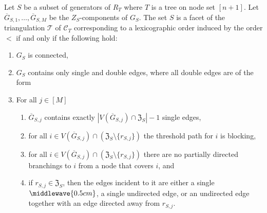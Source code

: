 \begin{theo}
    \label{thm: tree facet characterization}
    Let $S$ be a subset of generators of $R_T$ where $T$ is a tree on node set $[n+1]$. 
    Let $\overline{G}_{S,1},\ldots, \overline{G}_{S,M}$ be the $Z_S$-components of $G_S$. The set $S$ is a facet of the triangulation $\mathcal{T}$ of $\mathcal{C}_T$ corresponding to a lexicographic order induced by the order $<$ if and only if the following hold:
    \begin{enumerate}
        \item $G_S$ is connected,
        \item $G_S$ contains only single and double edges, where all double edges are of the form
        \begin{center}
    \end{center}
    \item For all $j\in[M]$
    \begin{enumerate}
        \item $\overline{G}_{S,j}$ contains exactly $|V(\overline{G}_{S,j})\cap\mathfrak{Z}_S| - 1$ single edges,
        \item for all $i\in V(\overline{G}_{S,j})\cap(\mathfrak{Z}_S\setminus\{r_{S,j}\})$ the threshold path for $i$ is blocking,
        \item for all $i\in V(\overline{G}_{S,j})\cap(\mathfrak{Z}_S\setminus\{r_{S,j}\})$ there are no partially directed branchings to $i$ from a node that covers $i$, and 
        \item if $r_{S,j}\in\mathfrak{Z}_S$, then the edges incident to it are either a single $\middlewave{0.5cm}$, a single undirected edge, or an undirected edge together with an edge directed away from $r_{S,j}$. 
    \end{enumerate}
    \end{enumerate}
\end{theo}

